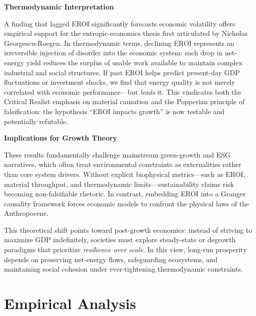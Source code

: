 \documentclass[a4paper,12pt]{article}
\begin{document}
\vspace{1em}
\noindent\textbf{Thermodynamic Interpretation}

\vspace{0.3em}
A finding that lagged EROI significantly forecasts economic volatility offers empirical support for the entropic-economics thesis first articulated by Nicholas Georgescu-Roegen. In thermodynamic terms, declining EROI represents an irreversible injection of disorder into the economic system: each drop in net-energy yield reduces the surplus of usable work available to maintain complex industrial and social structures. If past EROI helps predict present-day GDP fluctuations or investment shocks, we find that energy quality is not merely correlated with economic performance—but \textit{leads} it. This vindicates both the Critical Realist emphasis on material causation and the Popperian principle of falsification: the hypothesis ``EROI impacts growth'' is now testable and potentially refutable.

\vspace{1em}
\noindent\textbf{Implications for Growth Theory}

\vspace{0.3em}
These results fundamentally challenge mainstream green-growth and ESG narratives, which often treat environmental constraints as externalities rather than core system drivers. Without explicit biophysical metrics—such as EROI, material throughput, and thermodynamic limits—sustainability claims risk becoming non-falsifiable rhetoric. In contrast, embedding EROI into a Granger causality framework forces economic models to confront the physical laws of the Anthropocene.

This theoretical shift points toward post-growth economics: instead of striving to maximize GDP indefinitely, societies must explore steady-state or degrowth paradigms that prioritize \textit{resilience over scale}. In this view, long-run prosperity depends on preserving net-energy flows, safeguarding ecosystems, and maintaining social cohesion under ever-tightening thermodynamic constraints.

\section{Empirical Analysis}
\end{document}
